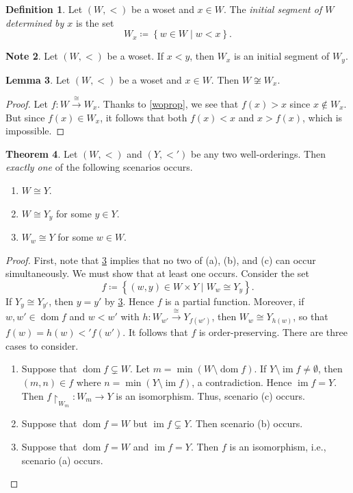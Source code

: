 \documentclass[10pt,letterpaper,cm]{nupset}
\theoremstyle{definition}
\newtheorem{definition}{Definition}[subsection]
\newtheorem{note}[definition]{Note}
\theoremstyle{theorem}
\newtheorem{theorem}[definition]{Theorem}
\newtheorem{lemma}[definition]{Lemma}
\theoremstyle{remark}
\newcommand{\1}{\mathbf{1}}
\newcommand{\0}{\vec 0}
\DeclareMathOperator{\im}{im}
\DeclareMathOperator{\dom}{dom}
\begin{document}
\begin{definition}
Let $\left(W, <\right)$ be a woset and $x\in W$. The \textit{initial segment of $W$ determined by $x$} is the set $$W_x \coloneqq \left\{ w\in W \mid w<x\right\}.$$
\end{definition}

\begin{note}
Let $\left(W, <\right)$ be a woset. If $x<y$, then $W_x$ is an initial segment of $W_y$.
\end{note}

\begin{lemma}\label{non-iso}
Let $\left(W, <\right)$ be a woset and $x\in W$. Then $W\not \cong W_x$.
\end{lemma}
\begin{proof}
Let $f : W \overset{\cong}{\longrightarrow} W_x$. Thanks to \cref{woprop}, we see that $f(x) >x$ since $x\notin W_x$. But since $f(x) \in W_x$, it follows that both $f(x) <x$ and $x>f(x)$, which is impossible. 
\end{proof}

\begin{theorem}
Let $\left(W, <\right)$ and $\left(Y, <'\right)$ be any two well-orderings.  Then \emph{exactly one} of the following scenarios occurs. 
\begin{enumerate}[label=(\alph*)]
\item $W \cong Y$.
\item $W \cong  Y_y$ for some $y\in Y$.
\item $W_w \cong Y$ for some $w\in W$.
\end{enumerate}
\end{theorem}
\begin{proof}
First, note that \cref{non-iso} implies that no two of (a), (b), and (c) can occur simultaneously. We must show that at least one occurs. Consider the set $$ f \coloneqq \left\{(w,y) \in W\times Y \mid W_w \cong Y_y\right\}  .$$ If $Y_y \cong Y_{y'}$, then $y = y'$ by \cref{non-iso}. Hence $f$ is a partial function. Moreover,  if $w,w'\in \dom{f}$ and $w<w'$ with $h : W_{w'} \overset{\cong}{\longrightarrow} Y_{f(w')}$, then $W_w \cong Y_{h(w)}$, so that $f(w) = h(w)<' f(w')$. It follows that $f$ is order-preserving. 
There are three cases to consider.
\begin{enumerate}[label=(\roman*)]
\item Suppose that $\dom{f} \subsetneq W$. Let $m = \min(W \setminus \dom{f})$. If $Y \setminus \im{f} \ne \emptyset$, then $\left(m, n\right) \in f$ where $n = \min(Y \setminus \im{f})$, a contradiction. Hence $\im{f} = Y$. Then $f\restriction_{W_m} : W_m \to Y$ is an isomorphism. Thus, scenario (c) occurs.
\item Suppose that $\dom{f} = W$ but $\im{f} \subsetneq Y$. Then scenario (b) occurs.
\item Suppose that $\dom{f} = W$ and $\im{f} = Y$. Then $f$ is an isomorphism, i.e., scenario (a) occurs.
\end{enumerate}
\end{proof}
\end{document}
